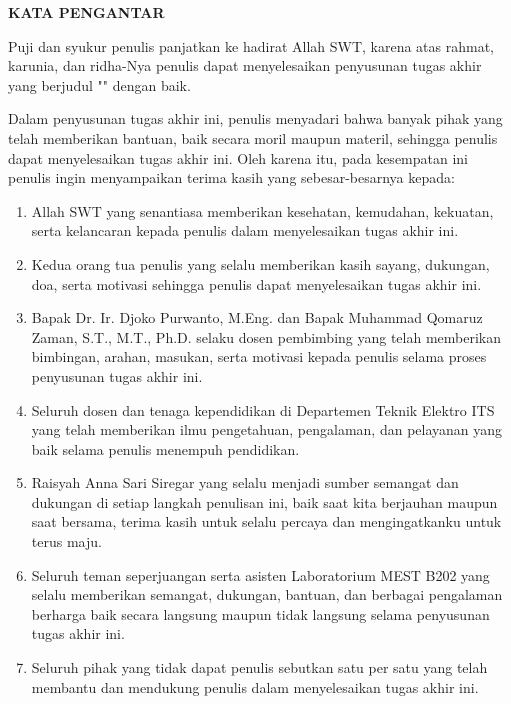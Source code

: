 \begin{center}
  \Large
  \textbf{KATA PENGANTAR}
\end{center}


\vspace{2ex}

Puji dan syukur penulis panjatkan ke hadirat Allah SWT, karena atas rahmat, karunia, dan ridha-Nya penulis dapat menyelesaikan penyusunan tugas akhir yang berjudul "\tatitle{}" dengan baik.

Dalam penyusunan tugas akhir ini, penulis menyadari bahwa banyak pihak yang telah memberikan bantuan, baik secara moril maupun materil, sehingga penulis dapat menyelesaikan tugas akhir ini. Oleh karena itu, pada kesempatan ini penulis ingin menyampaikan terima kasih yang sebesar-besarnya kepada:

\begin{enumerate}[nolistsep]
  \item Allah SWT yang senantiasa memberikan kesehatan, kemudahan, kekuatan, serta kelancaran kepada penulis dalam menyelesaikan tugas akhir ini.
  
  \item Kedua orang tua penulis yang selalu memberikan kasih sayang, dukungan, doa, serta motivasi sehingga penulis dapat menyelesaikan tugas akhir ini.
  
  \item Bapak Dr. Ir. Djoko Purwanto, M.Eng. dan Bapak Muhammad Qomaruz Zaman, S.T., M.T., Ph.D. selaku dosen pembimbing yang telah memberikan bimbingan, arahan, masukan, serta motivasi kepada penulis selama proses penyusunan tugas akhir ini.
  
  \item Seluruh dosen dan tenaga kependidikan di Departemen Teknik Elektro ITS yang telah memberikan ilmu pengetahuan, pengalaman, dan pelayanan yang baik selama penulis menempuh pendidikan.
  
  \item Raisyah Anna Sari Siregar yang selalu menjadi sumber semangat dan dukungan di setiap langkah penulisan ini, baik saat kita berjauhan maupun saat bersama, terima kasih untuk selalu percaya dan mengingatkanku untuk terus maju.
  
  \item Seluruh teman seperjuangan serta asisten Laboratorium MEST B202 yang selalu memberikan semangat, dukungan, bantuan, dan berbagai pengalaman berharga baik secara langsung maupun tidak langsung selama penyusunan tugas akhir ini.
  
  \item Seluruh pihak yang tidak dapat penulis sebutkan satu per satu yang telah membantu dan mendukung penulis dalam menyelesaikan tugas akhir ini.
\end{enumerate}

